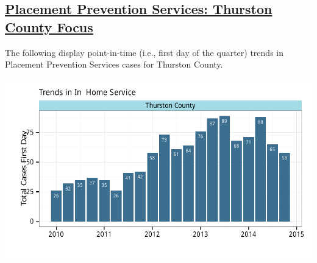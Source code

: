 \documentclass{article}\usepackage[]{graphicx}\usepackage[]{color}
\makeatletter
\def\maxwidth{ %
  \ifdim\Gin@nat@width>\linewidth
    \linewidth
  \else
    \Gin@nat@width
  \fi
}
\newenvironment{knitrout}{}{} %
\makeatother
\begin{document}
\begin{minipage}{\textwidth}
\subsection{\href{http://www.partnersforourchildren.org/data-portal/visualizations/home-services/trends}
    {Placement Prevention Services: Thurston County Focus}
}
The following display point-in-time (i.e., first day of the quarter) trends in Placement Prevention Services cases for Thurston County. %
\nopagebreak[3]
\begin{knitrout}
\color{fgcolor}

{\centering \includegraphics[width=\maxwidth]{figure/ihs_focus-1} 

}



\end{knitrout}
\end{minipage}

\newpage
\end{document}
